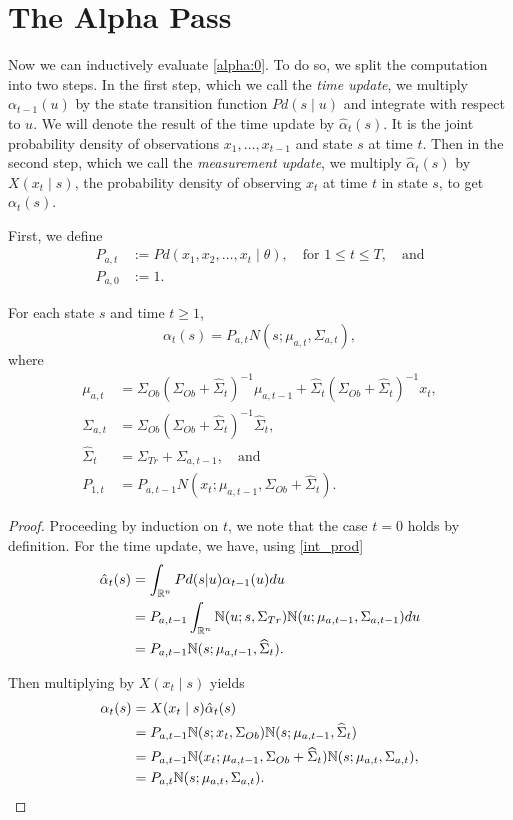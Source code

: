 \documentclass[12pt,leqno]{article}
\begin{document}
\section{The Alpha Pass}
  Now we can inductively evaluate \eqref{alpha:0}. To do so, we split the computation
  into two steps.  In the first step, which we call the {\em time update}, we multiply
  $\alpha_{t-1}(u)$ by the state transition function $Pd(s\mid u)$ and integrate with respect
  to $u$. We will denote the result of the time update by $\hat{\alpha}_t(s)$.  It is the joint probability
  density of observations $x_1,\dots,x_{t-1}$ and state $s$ at time $t$.
  Then in the second step, which we call the {\em measurement update}, we multiply
  $\hat{\alpha}_t(s)$ by $X(x_t \mid s)$, the probability density of observing $x_t$ at time $t$
  in state $s$, to get $\alpha_t(s)$.

  First, we define
\begin{align*}
  P_{a,t} &:= Pd(x_1,x_2,\dots,x_t \mid \theta),\quad\text{for $1\le t\le T$},\quad\text{and}\\
  P_{a,0} &:= 1.
\end{align*}

\begin{Thm}\label{alpha:1}
  For each state $s$ and time $t \ge 1$,
$$
  \alpha_t(s) = P_{a,t}N(s;\mu_{a,t},\Sigma_{a,t}),
$$
where
\begin{align*}
  \mu_{a,t} &= \Sigma_{Ob}(\Sigma_{Ob}+\widehat{\Sigma}_t)^{-1}\mu_{a,t-1}
  + \widehat{\Sigma}_t(\Sigma_{Ob}+\widehat{\Sigma}_t)^{-1}x_t, \\
  \Sigma_{a,t} &= \Sigma_{Ob}(\Sigma_{Ob}+\widehat{\Sigma}_t)^{-1}\widehat{\Sigma}_t,\\
  \widehat{\Sigma}_t &= \Sigma_{Tr}+\Sigma_{a,t-1},
 \quad\text{and}\\
  P_{1,t} &=P_{a,t-1}N(x_t;\mu_{a,t-1},\Sigma_{Ob} + \widehat{\Sigma}_t).
\end{align*}
\end{Thm}

\begin{proof}

Proceeding by induction on $t$, we note that the case $t = 0$ holds by definition.
For the time update, we have, using \eqref{int_prod}
\begin{align}
  \hat{\alpha}_t(s) &= \int_{{\mathbb R}^n}Pd(s|u)\alpha_{t-1}(u)du \\\notag
 &= P_{a,t-1}\int_{{\mathbb R}^n}{\mathbb N}(u;s,\Sigma_{Tr}){\mathbb N}(u;\mu_{a,t-1},\Sigma_{a,t-1})du \notag\\
 &= P_{a,t-1}{\mathbb N}(s;\mu_{a,t-1},\widehat{\Sigma}_t).
\end{align}

Then multiplying by $X(x_t\mid s)$ yields
\begin{align*}
  \alpha_t(s) &= X(x_t\mid s)\hat{\alpha}_t(s) \\
  &= P_{a,t-1}{\mathbb N}(s;x_t,\Sigma_{Ob}){\mathbb N}(s;\mu_{a,t-1},\widehat{\Sigma}_t) \\
  &= P_{a,t-1}{\mathbb N}(x_t;\mu_{a,t-1},\Sigma_{Ob} + \widehat{\Sigma}_t){\mathbb N}(s;\mu_{a,t},\Sigma_{a,t}), \\
  &= P_{a,t}{\mathbb N}(s;\mu_{a,t},\Sigma_{a,t}).
\end{align*}
\end{proof}
\end{document}
